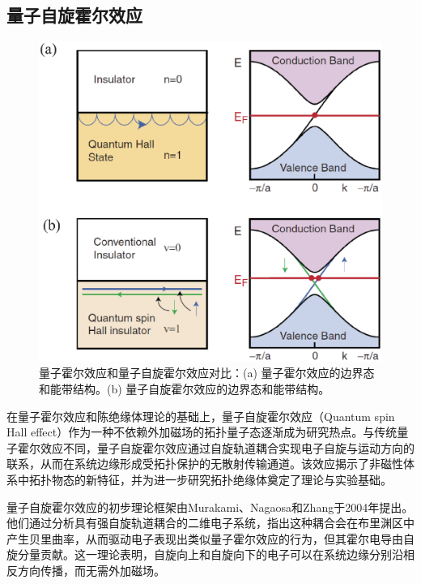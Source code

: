 \subsection{量子自旋霍尔效应}

\begin{figure}[h!]
    \centering
    \includegraphics[width=1\textwidth]{images/fig1-3.eps} 
    \caption{量子霍尔效应和量子自旋霍尔效应对比：(a) 量子霍尔效应的边界态和能带结构。(b) 量子自旋霍尔效应的边界态和能带结构\cite{r11}。}
    \label{fig_1_3}
\end{figure}

在量子霍尔效应和陈绝缘体理论的基础上，量子自旋霍尔效应（Quantum spin Hall effect）作为一种不依赖外加磁场的拓扑量子态逐渐成为研究热点。与传统量子霍尔效应不同，量子自旋霍尔效应通过自旋轨道耦合实现电子自旋与运动方向的联系，从而在系统边缘形成受拓扑保护的无散射传输通道。该效应揭示了非磁性体系中拓扑物态的新特征，并为进一步研究拓扑绝缘体奠定了理论与实验基础。

量子自旋霍尔效应的初步理论框架由Murakami、Nagaosa和Zhang于2004年提出\cite{e1}。他们通过分析具有强自旋轨道耦合的二维电子系统，指出这种耦合会在布里渊区中产生贝里曲率，从而驱动电子表现出类似量子霍尔效应的行为，但其霍尔电导由自旋分量贡献。这一理论表明，自旋向上和自旋向下的电子可以在系统边缘分别沿相反方向传播，而无需外加磁场。

